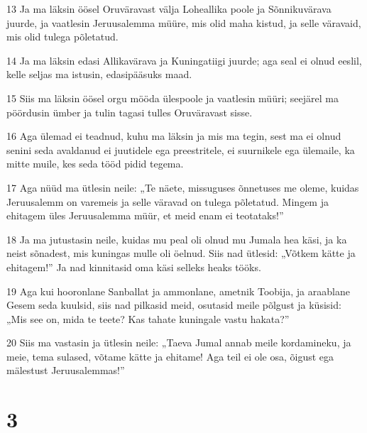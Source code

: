 \par 13 Ja ma läksin öösel Oruväravast välja Loheallika poole ja Sõnnikuvärava juurde, ja vaatlesin Jeruusalemma müüre, mis olid maha kistud, ja selle väravaid, mis olid tulega põletatud.
\par 14 Ja ma läksin edasi Allikavärava ja Kuningatiigi juurde; aga seal ei olnud eeslil, kelle seljas ma istusin, edasipääsuks maad.
\par 15 Siis ma läksin öösel orgu mööda ülespoole ja vaatlesin müüri; seejärel ma pöördusin ümber ja tulin tagasi tulles Oruväravast sisse.
\par 16 Aga ülemad ei teadnud, kuhu ma läksin ja mis ma tegin, sest ma ei olnud senini seda avaldanud ei juutidele ega preestritele, ei suurnikele ega ülemaile, ka mitte muile, kes seda tööd pidid tegema.
\par 17 Aga nüüd ma ütlesin neile: „Te näete, missuguses õnnetuses me oleme, kuidas Jeruusalemm on varemeis ja selle väravad on tulega põletatud. Mingem ja ehitagem üles Jeruusalemma müür, et meid enam ei teotataks!”
\par 18 Ja ma jutustasin neile, kuidas mu peal oli olnud mu Jumala hea käsi, ja ka neist sõnadest, mis kuningas mulle oli öelnud. Siis nad ütlesid: „Võtkem kätte ja ehitagem!” Ja nad kinnitasid oma käsi selleks heaks tööks.
\par 19 Aga kui hooronlane Sanballat ja ammonlane, ametnik Toobija, ja araablane Gesem seda kuulsid, siis nad pilkasid meid, osutasid meile põlgust ja küsisid: „Mis see on, mida te teete? Kas tahate kuningale vastu hakata?”
\par 20 Siis ma vastasin ja ütlesin neile: „Taeva Jumal annab meile kordamineku, ja meie, tema sulased, võtame kätte ja ehitame! Aga teil ei ole osa, õigust ega mälestust Jeruusalemmas!”

\chapter{3}

